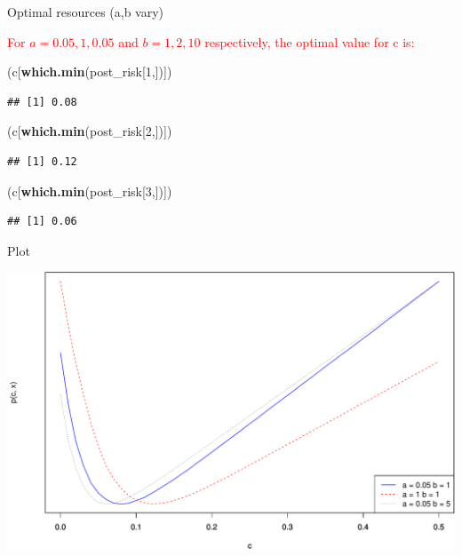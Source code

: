 \documentclass[
  ignorenonframetext,
]{beamer}
\newenvironment{Shaded}{\begin{snugshade}}{\end{snugshade}}
\newcommand{\DecValTok}[1]{\textcolor[rgb]{0.00,0.00,0.81}{#1}}
\newcommand{\KeywordTok}[1]{\textcolor[rgb]{0.13,0.29,0.53}{\textbf{#1}}}
\newcommand{\NormalTok}[1]{#1}
\begin{document}
\begin{frame}[fragile]{Optimal resources (a,b vary)}
\protect\hypertarget{optimal-resources-ab-vary}{}

\textcolor{red}{For $a = 0.05, 1, 0.05$ and $b = 1, 2, 10$ respectively,
the optimal value for c is:}

\begin{Shaded}
\begin{Highlighting}[]
\NormalTok{(c[}\KeywordTok{which.min}\NormalTok{(post_risk[}\DecValTok{1}\NormalTok{,])])}
\end{Highlighting}
\end{Shaded}

\begin{verbatim}
## [1] 0.08
\end{verbatim}

\begin{Shaded}
\begin{Highlighting}[]
\NormalTok{(c[}\KeywordTok{which.min}\NormalTok{(post_risk[}\DecValTok{2}\NormalTok{,])])}
\end{Highlighting}
\end{Shaded}

\begin{verbatim}
## [1] 0.12
\end{verbatim}

\begin{Shaded}
\begin{Highlighting}[]
\NormalTok{(c[}\KeywordTok{which.min}\NormalTok{(post_risk[}\DecValTok{3}\NormalTok{,])])}
\end{Highlighting}
\end{Shaded}

\begin{verbatim}
## [1] 0.06
\end{verbatim}

\end{frame}

\begin{frame}{Plot}
\protect\hypertarget{plot-1}{}

\includegraphics{02-intro-to-Bayes_files/figure-beamer/unnamed-chunk-12-1.pdf}

\end{frame}
\end{document}
